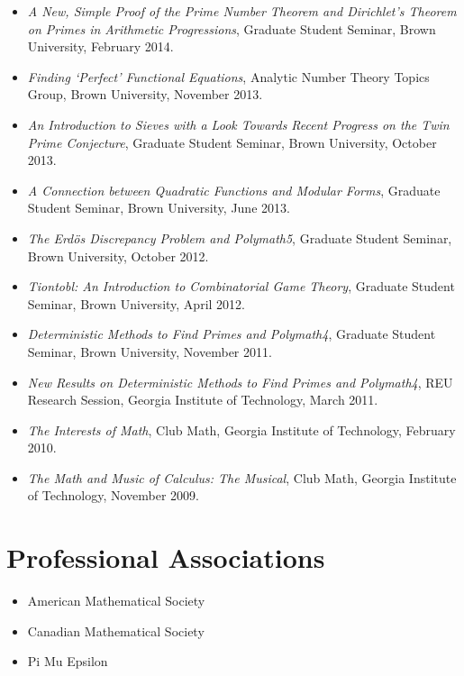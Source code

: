 \begin{itemize}
    \item \emph{A New, Simple Proof of the Prime Number Theorem and Dirichlet's Theorem on
      Primes in Arithmetic Progressions},
      Graduate Student Seminar,
      Brown University,
      February 2014.

    \item \emph{Finding `Perfect' Functional Equations},
      Analytic Number Theory Topics Group,
      Brown University,
      November 2013.

    \item \emph{An Introduction to Sieves with a Look Towards Recent Progress on the Twin
      Prime Conjecture},
      Graduate Student Seminar,
      Brown University,
      October 2013.

    \item \emph{A Connection between Quadratic Functions and Modular Forms},
      Graduate Student Seminar,
      Brown University,
      June 2013.

    \item \emph{The Erd\"os Discrepancy Problem and Polymath5},
      Graduate Student Seminar,
      Brown University,
      October 2012.

    \item \emph{Tiontobl: An Introduction to Combinatorial Game Theory},
      Graduate Student Seminar,
      Brown University,
      April 2012.

    \item \emph{Deterministic Methods to Find Primes and Polymath4},
      Graduate Student Seminar,
      Brown University,
      November 2011.

    \item \emph{New Results on Deterministic Methods to Find Primes and Polymath4},
      REU Research Session,
      Georgia Institute of Technology,
      March 2011.

    \item \emph{The Interests of Math},
      Club Math,
      Georgia Institute of Technology,
      February 2010.

    \item \emph{The Math and Music of Calculus: The Musical},
      Club Math,
      Georgia Institute of Technology,
      November 2009.

\end{itemize}

\section*{Professional Associations}

\begin{itemize}
  \item American Mathematical Society
  \item Canadian Mathematical Society
  \item Pi Mu Epsilon
\end{itemize}

